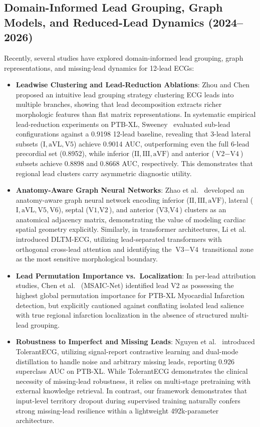\documentclass[5p,twocolumn,10pt]{elsarticle}
\begin{document}
\subsection{Domain-Informed Lead Grouping, Graph Models, and Reduced-Lead Dynamics (2024--2026)}
Recently, several studies have explored domain-informed lead grouping, graph representations, and missing-lead dynamics for 12-lead ECGs:
\begin{itemize}
    \item \textbf{Leadwise Clustering and Lead-Reduction Ablations}: Zhou and Chen~\cite{zhou2024leadwise} proposed an intuitive lead grouping strategy clustering ECG leads into multiple branches, showing that lead decomposition extracts richer morphologic features than flat matrix representations. In systematic empirical lead-reduction experiments on PTB-XL, Sweeney~\cite{sweeney2024lead} evaluated sub-lead configurations against a 0.9198 12-lead baseline, revealing that 3-lead lateral subsets ($\text{I}, \text{aVL}, \text{V5}$) achieve 0.9014 AUC, outperforming even the full 6-lead precordial set (0.8952), while inferior ($\text{II}, \text{III}, \text{aVF}$) and anterior ($\text{V2}-\text{V4}$) subsets achieve 0.8898 and 0.8668 AUC, respectively. This demonstrates that regional lead clusters carry asymmetric diagnostic utility.
    \item \textbf{Anatomy-Aware Graph Neural Networks}: Zhao et al.~\cite{anat_graph2026} developed an anatomy-aware graph neural network encoding inferior ($\text{II}, \text{III}, \text{aVF}$), lateral ($\text{I}, \text{aVL}, \text{V5}, \text{V6}$), septal ($\text{V1}, \text{V2}$), and anterior ($\text{V3}, \text{V4}$) clusters as an anatomical adjacency matrix, demonstrating the value of modeling cardiac spatial geometry explicitly. Similarly, in transformer architectures, Li et al.~\cite{dltm_ecg2026} introduced DLTM-ECG, utilizing lead-separated transformers with orthogonal cross-lead attention and identifying the $\text{V3}-\text{V4}$ transitional zone as the most sensitive morphological boundary.
    \item \textbf{Lead Permutation Importance vs.\ Localization}: In per-lead attribution studies, Chen et al.~\cite{msaicnet2026} (MSAIC-Net) identified lead V2 as possessing the highest global permutation importance for PTB-XL Myocardial Infarction detection, but explicitly cautioned against conflating isolated lead salience with true regional infarction localization in the absence of structured multi-lead grouping.
    \item \textbf{Robustness to Imperfect and Missing Leads}: Nguyen et al.~\cite{nguyen2025tolerantecg} introduced TolerantECG, utilizing signal-report contrastive learning and dual-mode distillation to handle noise and arbitrary missing leads, reporting 0.926 superclass AUC on PTB-XL. While TolerantECG demonstrates the clinical necessity of missing-lead robustness, it relies on multi-stage pretraining with external knowledge retrieval. In contrast, our framework demonstrates that input-level territory dropout during supervised training naturally confers strong missing-lead resilience within a lightweight 492k-parameter architecture.

\end{itemize}
\end{document}

